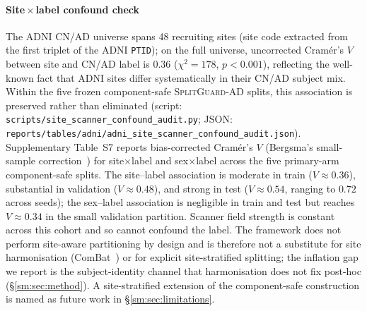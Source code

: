 \documentclass[11pt]{article}
\newcommand{\SGA}{\textsc{SplitGuard-AD}}
\providecommand{\pb}{\discretionary{}{}{}}
\begin{document}
\paragraph{Site\,$\times$\,label confound check}
The ADNI CN/AD universe spans 48 recruiting sites (site code extracted
from the first triplet of the ADNI \texttt{PTID}); on the full
universe, uncorrected Cram\'{e}r's $V$ between site and CN/AD label is
$0.36$ ($\chi^2 = 178$, $p < 0.001$), reflecting the well-known fact
that ADNI sites differ systematically in their CN/AD subject mix.
Within the five frozen component-safe \SGA{} splits, this association
is preserved rather than eliminated (script:
\texttt{scripts/\pb site\_scanner\_confound\_audit.py}; JSON:
\texttt{reports/\pb tables/\pb adni/\pb adni\_site\_scanner\_confound\_audit.json}).
Supplementary Table~S7 reports bias-corrected
Cram\'{e}r's $V$ (Bergsma's small-sample correction~\cite{bergsma2013}) for
site$\times$label and sex$\times$label across the five primary-arm
component-safe splits. The site--label association is moderate in
train ($V\approx 0.36$), substantial in validation
($V\approx 0.48$), and strong in test ($V\approx 0.54$, ranging to
$0.72$ across seeds); the sex--label association is negligible in
train and test but reaches $V\approx 0.34$ in the small validation
partition. Scanner field strength is constant across this cohort
and so cannot confound the label. The framework does not perform site-aware
partitioning by design and is therefore not a substitute for site
harmonisation
(ComBat~\cite{johnson2007combat,fortin2017combat,pomponio2020lifespan,bashyam2022deepharmony})
or for explicit site-stratified splitting; the inflation gap we
report is the subject-identity channel that harmonisation does not
fix post-hoc (\S\ref{sm:sec:method}). A site-stratified extension of
the component-safe construction is named as future work in
\S\ref{sm:sec:limitations}.
\end{document}
